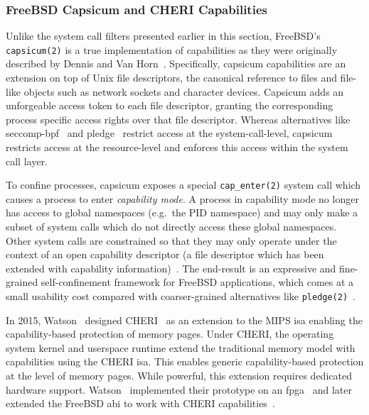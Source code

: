 \subsubsection*{FreeBSD Capsicum and CHERI Capabilities}
\label{sss:capsicum}

Unlike the system call filters presented earlier in this section, FreeBSD's
\texttt{capsicum(2)} \cite{watson2010_capsicum, anderson2017_comparison} is a true
implementation of capabilities as they were originally described by Dennis and Van
Horn~\cite{dennis1966_semantics}. Specifically, capsicum capabilities are an extension on
top of Unix file descriptors, the canonical reference to files and file-like objects such
as network sockets and character devices. Capsicum adds an unforgeable access token to
each file descriptor, granting the corresponding process specific access rights over that
file descriptor. Whereas alternatives like seccomp-bpf~\cite{seccomp} and
pledge~\cite{pledge} restrict access at the system-call-level, capsicum restricts access
at the resource-level and enforces this access within the system call layer.

To confine processes, capsicum exposes a special \texttt{cap\_enter(2)} system call which
causes a process to enter \textit{capability mode}. A process in capability mode no longer
has access to global namespaces (e.g.~the PID namespace) and may only make a subset of
system calls which do not directly access these global namespaces. Other system calls are
constrained so that they may only operate under the context of an open capability
descriptor (a file descriptor which has been extended with capability
information)~\cite{watson2010_capsicum}. The end-result is an expressive and fine-grained
self-confinement framework for FreeBSD applications, which comes at a small usability cost
compared with coarser-grained alternatives like \texttt{pledge(2)}~\cite{pledge}.

In 2015, Watson \etal~designed CHERI~\cite{watson2015_cheri} as an extension to the MIPS
\gls{isa} enabling the capability-based protection of memory pages. Under CHERI, the
operating system kernel and userspace runtime extend the traditional memory model with
capabilities using the CHERI \gls{isa}. This enables generic capability-based protection at
the level of memory pages. While powerful, this extension requires dedicated hardware
support. Watson \etal~implemented their prototype on an \gls{fpga}~\cite{watson2015_cheri}
and later extended the FreeBSD \gls{abi} to work with CHERI capabilities~\cite{davis2019_cheriabi}.



